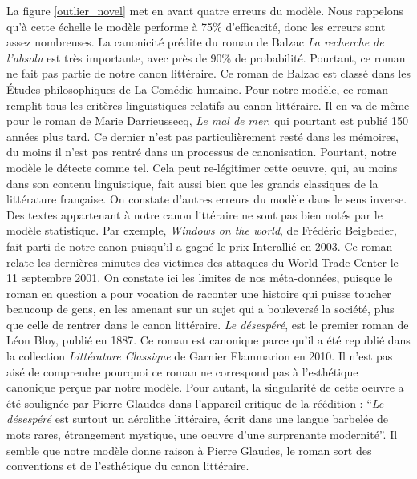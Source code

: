 La figure \ref{outlier_novel} met en avant quatre erreurs du modèle. Nous rappelons qu'à cette échelle le modèle performe à 75\% d'efficacité, donc les erreurs sont assez nombreuses. La canonicité prédite du roman de Balzac \textit{La recherche de l'absolu} est très importante, avec près de 90\% de probabilité. Pourtant, ce roman ne fait pas partie de notre canon littéraire. Ce roman de Balzac est classé dans les Études philosophiques de La Comédie humaine. Pour notre modèle, ce roman remplit tous les critères linguistiques relatifs au canon littéraire. Il en va de même pour le roman de Marie Darrieussecq, \textit{Le mal de mer}, qui pourtant est publié 150 années plus tard. Ce dernier n'est pas particulièrement resté dans les mémoires, du moins il n'est pas rentré dans un processus de canonisation. Pourtant, notre modèle le détecte comme tel. Cela peut re-légitimer cette oeuvre, qui, au moins dans son contenu linguistique, fait aussi bien que les grands classiques de la littérature française. On constate d'autres erreurs du modèle dans le sens inverse. Des textes appartenant à notre canon littéraire ne sont pas bien notés par le modèle statistique. Par exemple, \textit{Windows on the world}, de Frédéric Beigbeder, fait parti de notre canon puisqu'il a gagné le prix Interallié en 2003. Ce roman relate les dernières minutes des victimes des attaques du World Trade Center le 11 septembre 2001. On constate ici les limites de nos méta-données, puisque le roman en question a pour vocation de raconter une histoire qui puisse toucher beaucoup de gens, en les amenant sur un sujet qui a bouleversé la société, plus que celle de rentrer dans le canon littéraire. \textit{Le désespéré}, est le premier roman de Léon Bloy, publié en 1887. Ce roman est canonique parce qu'il a été republié dans la collection \textit{Littérature Classique} de Garnier Flammarion en 2010. Il n'est pas aisé de comprendre pourquoi ce roman ne correspond pas à l'esthétique canonique perçue par notre modèle. Pour autant, la singularité de cette oeuvre a été soulignée par Pierre Glaudes dans l'appareil critique de la réédition : \enquote{\textit{Le désespéré} est surtout un aérolithe littéraire, écrit dans une langue barbelée de mots rares, étrangement mystique, une oeuvre d'une surprenante modernité}. Il semble que notre modèle donne raison à Pierre Glaudes, le roman sort des conventions et de l'esthétique du canon littéraire. 


